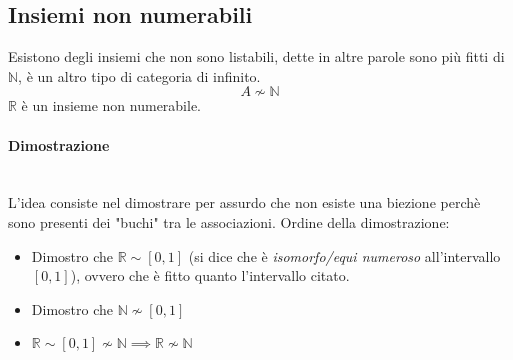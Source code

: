\documentclass{article}
\begin{document}
\subsection{Insiemi non numerabili}
Esistono degli insiemi che non sono listabili, dette in altre parole sono più fitti di $\mathbb{N}$,
è un altro tipo di categoria di infinito.
$$A\nsim\mathbb{N}$$
$\mathbb{R}$ è un insieme non numerabile.
\paragraph{Dimostrazione}\mbox{}\\
L'idea consiste nel dimostrare per assurdo che non esiste una biezione
perchè sono presenti dei "buchi" tra le associazioni. Ordine della dimostrazione:
\begin{itemize}
    \item Dimostro che $\mathbb{R}\sim[0,1]$ (si dice che è \textit{isomorfo/equi numeroso} all'intervallo $[0,1]$),
          ovvero che è fitto quanto l'intervallo citato.
    \item Dimostro che $\mathbb{N}\nsim[0,1]$
    \item $\mathbb{R}\sim[0,1]\nsim\mathbb{N}\implies\mathbb{R}\nsim\mathbb{N}$
\end{itemize}
\end{document}
